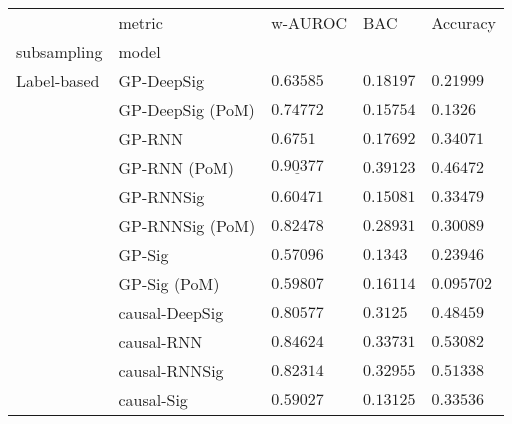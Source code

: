 \begin{tabular}{lllll}
\toprule
       & metric &                               w-AUROC &                                   BAC &                             Accuracy \\
subsampling & model &                                       &                                       &                                      \\
\midrule
Label-based & GP-DeepSig &                           $ 0.63585 $ &                           $ 0.18197 $ &                          $ 0.21999 $ \\
       & GP-DeepSig (PoM) &                           $ 0.74772 $ &                           $ 0.15754 $ &                           $ 0.1326 $ \\
       & GP-RNN &                            $ 0.6751 $ &                           $ 0.17692 $ &                          $ 0.34071 $ \\
       & GP-RNN (PoM) &            $  \underline{ 0.90377 } $ &                           $ 0.39123 $ &                          $ 0.46472 $ \\
       & GP-RNNSig &                           $ 0.60471 $ &                           $ 0.15081 $ &                          $ 0.33479 $ \\
       & GP-RNNSig (PoM) &                           $ 0.82478 $ &                           $ 0.28931 $ &                          $ 0.30089 $ \\
       & GP-Sig &                           $ 0.57096 $ &                            $ 0.1343 $ &                          $ 0.23946 $ \\
       & GP-Sig (PoM) &                           $ 0.59807 $ &                           $ 0.16114 $ &                         $ 0.095702 $ \\
       & causal-DeepSig &                           $ 0.80577 $ &                            $ 0.3125 $ &                          $ 0.48459 $ \\
       & causal-RNN &                           $ 0.84624 $ &                           $ 0.33731 $ &                          $ 0.53082 $ \\
       & causal-RNNSig &                           $ 0.82314 $ &                           $ 0.32955 $ &                          $ 0.51338 $ \\
       & causal-Sig &                           $ 0.59027 $ &                           $ 0.13125 $ &                          $ 0.33536 $ \\

\end{tabular}
